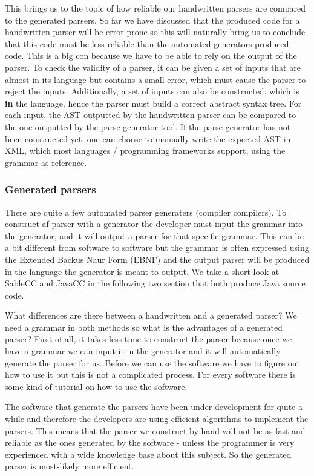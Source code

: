 This brings us to the topic of how reliable our handwritten parsers are compared to the generated parsers. So far we have discussed that the produced code for a handwritten parser will be error-prone so this will naturally bring us to conclude that this code must be less reliable than the automated generators produced code. This is a big con because we have to be able to rely on the output of the parser. To check the validity of a parser, it can be given a set of inputs that are almost in its language but contains a small error, which must cause the parser to reject the inputs. Additionally, a set of inputs can also be constructed, which is \textbf{in} the language, hence the parser must build a correct abstract syntax tree. For each input, the AST outputted by the handwritten parser can be compared to the one outputted by the parse generator tool. If the parse generator has not been constructed yet, one can choose to manually write the expected AST in XML, which most languages / programming frameworks support, using the grammar as reference.

\subsubsection{Generated parsers}
\label{sec:ana-genparser}
There are quite a few automated parser generaters (compiler compilers). To construct af parser with a generator the developer must input the grammar into the generator, and it will output a parser for that specific grammar. This can be a bit different from software to software but the grammar is often expressed using the Extended Backus Naur Form (EBNF) and the output parser will be produced in the language the generator is meant to output. We take a short look at SableCC and JavaCC in the following two section that both produce Java source code.

What differences are there between a handwritten and a generated parser? We need a grammar in both methods so what is the advantages of a generated parser? First of all, it takes less time to construct the parser because once we have a grammar we can input it in the generator and it will automatically generate the parser for us. Before we can use the software we have to figure out how to use it but this is not a complicated process. For every software there is some kind of tutorial on how to use the software.

The software that generate the parsers have been under development for quite a while and therefore the developers are using efficient algorithms to implement the parsers. This means that the parser we construct by hand will not be as fast and reliable as the ones generated by the software - unless the programmer is very experienced with a wide knowledge base about this subject. So the generated parser is most-likely more efficient.

